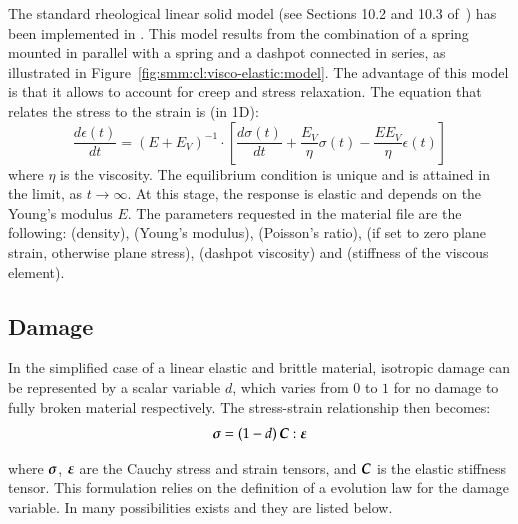 The standard rheological linear solid model (see Sections 10.2 and 10.3
of~\cite{simo92}) has been implemented in \akantu. This model results from the
combination of a spring mounted in parallel with a spring and a dashpot
connected in series, as illustrated in
Figure~\ref{fig:smm:cl:visco-elastic:model}. The advantage of this model is that
it allows to account for creep and stress relaxation. The equation that relates
the stress to the strain is (in 1D):
\begin{equation}
  \frac{d\epsilon(t)}{dt} = \left ( E + E_V \right ) ^ {-1} \cdot \left [ \frac{d\sigma(t)}{dt} + \frac{E_V}{\eta}\sigma(t) - \frac{EE_V}{\eta}\epsilon(t) \right ]
\end{equation}
where $\eta$ is the viscosity. The equilibrium condition is unique and is
attained in the limit, as $t \to \infty $. At this stage, the response is
elastic and depends on the Young's modulus $E$.  The parameters requested in the
material file are the following:  (density),  (Young's
modulus),  (Poisson's ratio),  (if set to zero
plane strain, otherwise plane stress),  (dashpot viscosity) and
 (stiffness of the viscous element).

\subsection{Damage}

In the  simplified case of a  linear elastic and brittle  material, isotropic
damage can be represented by a scalar variable $d$, which varies from $0$ to $1$
for  no  damage  to  fully  broken  material  respectively.  The  stress-strain
relationship then becomes:
\begin{equation*}
  \boldsymbol{\sigma} = (1-d)\, \boldsymbol{C}:\boldsymbol{\varepsilon}
\end{equation*}

where  $\boldsymbol{\sigma}$,  $\boldsymbol{\varepsilon}$ are  the  Cauchy  stress and  strain
tensors, and $\boldsymbol{C}$ is the elastic stiffness tensor. This formulation relies
on the definition of a evolution law for the damage variable. In \akantu many
possibilities exists and they are listed below.

